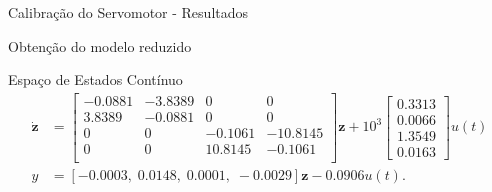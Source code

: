 \documentclass[10pt]{beamer}
\newcommand\Fontvii{\fontsize{7}{8.2}\selectfont}
\begin{document}
\begin{frame}[fragile]{Calibração do Servomotor - Resultados}

\begin{table}[!ht]
\centering
\caption{Dados de calibração do servomotor, média obtida é de 71.32 mm/unidade\label{calibracaoServomotor}}
\end{table}

\end{frame}

\begin{frame}[fragile]{Obtenção do modelo reduzido}
\begin{block}{Espaço de Estados Contínuo}
\Fontvii
\begin{align}
\mathbf{\dot{z}} &= \left[\begin{array}{cccc}
		-0.0881  & -3.8389 &         0 &         0\\
    3.8389 &   -0.0881 &         0 &         0\\
         0 &         0 &   -0.1061 &  -10.8145\\
         0 &        0 &   10.8145 &   -0.1061\\
	\end{array}\right]\mathbf{z} + 10^3 \left[\begin{array}{c}
	0.3313 \\
	    0.0066 \\
	    1.3549 \\
	    0.0163
	 \end{array}\right]u(t) \\
y &= \left[-0.0003,\;0.0148,\;0.0001,\;-0.0029\right]\mathbf{z} - 0.0906 u(t).
\end{align}
\end{block}
\end{frame}
\end{document}
